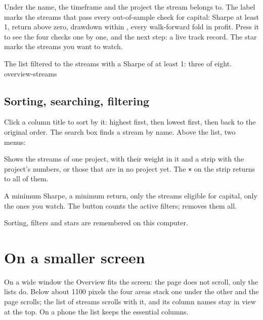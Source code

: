 \noindent
Under the name, the timeframe and the project the stream belongs to. The
 label marks the streams that pass every out-of-sample check
for capital: Sharpe at least 1, return above zero, drawdown within ,
every walk-forward fold in profit. Press it to see the four checks one by
one, and the next step: a live track record. The star marks the streams you
want to watch.

  {The list filtered to the streams with a Sharpe of at least 1: three of
   eight.}
  {overview-streams}

\subsection{Sorting, searching, filtering}

Click a column title to sort by it: highest first, then lowest first, then
back to the original order. The search box finds a stream by name. Above the
list, two menus:

\begin{description}[leftmargin = 1.4em, style = nextline, itemsep = 4pt]
  \item[\voce{All projects}] Shows the streams of one project, with their
    weight in it and a strip with the project's numbers, or those that are
    in no project yet. The \texttt{×} on the strip returns to all of them.
  \item[\voce{Filters}] A minimum Sharpe, a minimum return, only the
    streams eligible for capital, only the ones you watch. The button counts
    the active filters;  removes them all.
\end{description}

\noindent
Sorting, filters and stars are remembered on this computer.

\section{On a smaller screen}

On a wide window the Overview fits the screen: the page does not scroll,
only the lists do. Below about \num{1100} pixels the four areas stack one
under the other and the page scrolls; the list of streams scrolls with it,
and its column names stay in view at the top. On a phone the list keeps the
essential columns.
